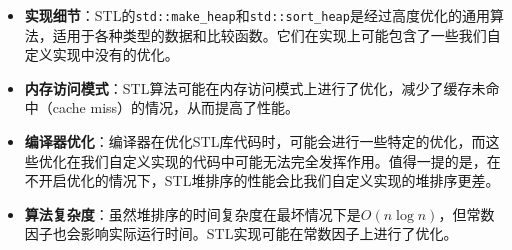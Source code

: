 \documentclass[UTF8]{ctexart}
\begin{document}
\begin{itemize}
    \item \textbf{实现细节}：STL的\texttt{std::make\_heap}和\texttt{std::sort\_heap}是经过高度优化的通用算法，适用于各种类型的数据和比较函数。它们在实现上可能包含了一些我们自定义实现中没有的优化。
    \item \textbf{内存访问模式}：STL算法可能在内存访问模式上进行了优化，减少了缓存未命中（cache miss）的情况，从而提高了性能。
    \item \textbf{编译器优化}：编译器在优化STL库代码时，可能会进行一些特定的优化，而这些优化在我们自定义实现的代码中可能无法完全发挥作用。值得一提的是，在不开启优化的情况下，STL堆排序的性能会比我们自定义实现的堆排序更差。
    \item \textbf{算法复杂度}：虽然堆排序的时间复杂度在最坏情况下是$O(n \log n)$，但常数因子也会影响实际运行时间。STL实现可能在常数因子上进行了优化。
\end{itemize}
\end{document}

